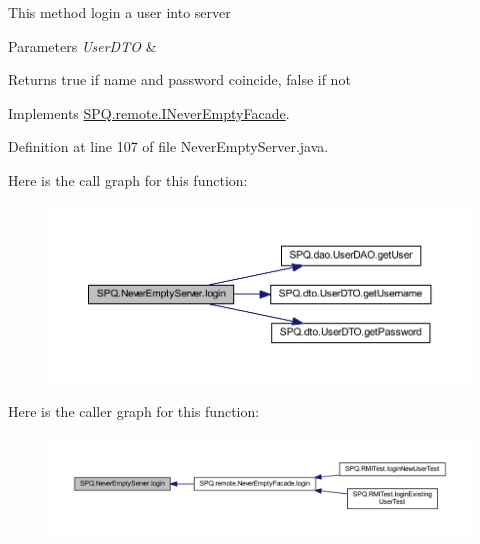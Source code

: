 This method login a user into server 
\begin{DoxyParams}{Parameters}
{\em User\+D\+TO} & \\
\hline
\end{DoxyParams}
\begin{DoxyReturn}{Returns}
true if name and password coincide, false if not 
\end{DoxyReturn}


Implements \mbox{\hyperlink{interface_s_p_q_1_1remote_1_1_i_never_empty_facade_a2440fa36695c63e4e4c30fc25965f853}{S\+P\+Q.\+remote.\+I\+Never\+Empty\+Facade}}.



Definition at line 107 of file Never\+Empty\+Server.\+java.

Here is the call graph for this function\+:\nopagebreak
\begin{figure}[H]
\begin{center}
\leavevmode
\includegraphics[width=350pt]{class_s_p_q_1_1_never_empty_server_a79e3b01cc25be204f24e01c7fccbef13_cgraph}
\end{center}
\end{figure}
Here is the caller graph for this function\+:\nopagebreak
\begin{figure}[H]
\begin{center}
\leavevmode
\includegraphics[width=350pt]{class_s_p_q_1_1_never_empty_server_a79e3b01cc25be204f24e01c7fccbef13_icgraph}
\end{center}
\end{figure}
\mbox{\label{class_s_p_q_1_1_never_empty_server_a954ea8c563055eae79564b357e557f85}} 
